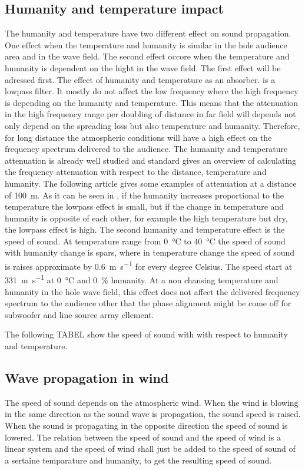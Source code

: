 \subsection{Humanity and temperature impact}\label{sec:ana:hu_temp}
The humanity and temperature have two different effect on sound propagation. One effect when the temperature and humanity is similar in the hole audience area and in the wave field. The second effect occore when the temperature and humanity is dependent on the hight in the wave field. The first effect will be adressed first. 
The effect of humanity and temperature as an absorber. is a lowpass filter. It mostly do not affect the low frequency where the high frequency is depending on the humanity and temperature. This means that the attenuation in the high frequency range per doubling of distance in far field will depends not only depend on the spreading loss but also temperature and humanity. Therefore, for long distance the atmospheric conditions will have a high effect on the frequency spectrum delivered to the audience. The humanity and temperature attenuation is already well studied and standard  \citep{iso_9613-1} gives an overview of calculating the frequency attenuation with respect to the distance, temperature and humanity. The following article \citep{corteel2017large} gives some examples of attenuation at a distance of \SI{100}{\meter}. As it can be seen in \citep{corteel2017large}, if the humanity increases proportional to the temperature the lowpass effect is small, but if the change in temperature and humanity is opposite of each other, for example the high temperature but dry, the lowpass effect is high. 
The second humanity and temperature effect is the speed of sound. At temperature range from \SI{0}{\celsius} to \SI{40}{\celsius} the speed of sound with humanity change is spars, where in temperature change the speed of sound is raises approximate by \SI{0.6}{\meter\per\second} for every degree Celsius. The speed start at \SI{331}{\meter\per\second} at \SI{0}{\celsius} and \SI{0}{\percent} humanity. At a non chansing temperature and humanity in the hole wave field, this effect does not affect the delivered frequency spectrum to the audience other that the phase alignment might be come off for subwoofer and line source array ellement.

The following TABEL show the speed of sound with with respect to humanity and temperature. 


\subsection{Wave propagation in wind}
The speed of sound depends on the atmospheric wind. When the wind is blowing in the same direction as the sound wave is propagation, the sound speed is raised. When the sound is propagating in the opposite direction the speed of sound is lowered. The relation between the speed of sound and the speed of wind is a linear system and the speed of wind shall just be added to the speed of sound of a sertaine temparature and humanity, to get the resulting speed of sound. 


